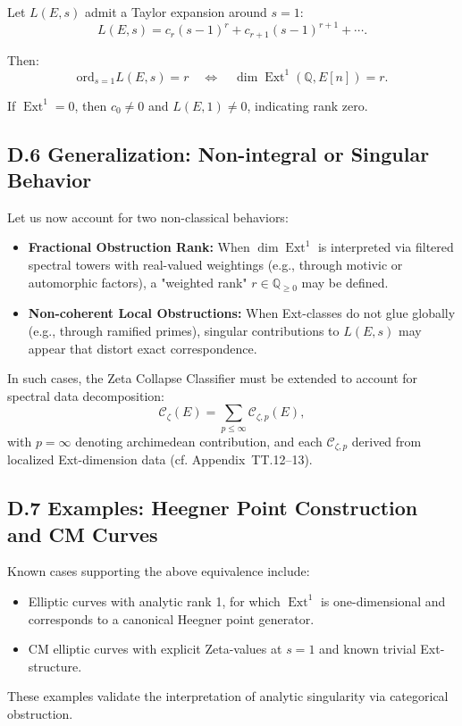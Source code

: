 \documentclass[11pt]{article}
\DeclareMathOperator{\Ext}{Ext}
\newcommand{\QQ}{\mathbb{Q}}
\begin{document}
Let $L(E,s)$ admit a Taylor expansion around $s=1$:
\[
L(E,s) = c_r (s-1)^r + c_{r+1} (s-1)^{r+1} + \cdots.
\]

Then:
\[
\mathrm{ord}_{s=1} L(E,s) = r \quad \Leftrightarrow \quad \dim \Ext^1(\QQ,E[n]) = r.
\]

If $\Ext^1 = 0$, then $c_0 \neq 0$ and $L(E,1) \neq 0$, indicating rank zero.

\subsection*{D.6 Generalization: Non-integral or Singular Behavior}

Let us now account for two non-classical behaviors:
\begin{itemize}
  \item \textbf{Fractional Obstruction Rank:} When $\dim \Ext^1$ is interpreted via filtered spectral towers with real-valued weightings (e.g., through motivic or automorphic factors), a "weighted rank" $r \in \mathbb{Q}_{\geq 0}$ may be defined.
  \item \textbf{Non-coherent Local Obstructions:} When Ext-classes do not glue globally (e.g., through ramified primes), singular contributions to $L(E,s)$ may appear that distort exact correspondence.
\end{itemize}

In such cases, the Zeta Collapse Classifier must be extended to account for spectral data decomposition:
\[
\mathcal{C}_\zeta(E) = \sum_{p \leq \infty} \mathcal{C}_{\zeta,p}(E),
\]
with $p = \infty$ denoting archimedean contribution, and each $\mathcal{C}_{\zeta,p}$ derived from localized Ext-dimension data (cf. Appendix~TT.12–13).

\subsection*{D.7 Examples: Heegner Point Construction and CM Curves}

Known cases supporting the above equivalence include:
\begin{itemize}
  \item Elliptic curves with analytic rank 1, for which $\Ext^1$ is one-dimensional and corresponds to a canonical Heegner point generator.
  \item CM elliptic curves with explicit Zeta-values at $s=1$ and known trivial Ext-structure.
\end{itemize}

These examples validate the interpretation of analytic singularity via categorical obstruction.
\end{document}
